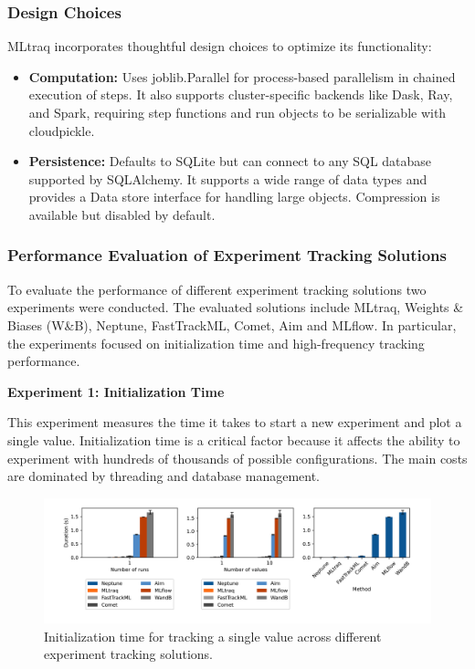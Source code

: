 \subsubsection{Design Choices}

MLtraq incorporates thoughtful design choices to optimize its functionality:

\begin{itemize}
    \item \textbf{Computation:} Uses joblib.Parallel for process-based parallelism in chained execution of steps. It also supports cluster-specific backends like Dask, Ray, and Spark, requiring step functions and run objects to be serializable with cloudpickle.
    \item \textbf{Persistence:} Defaults to SQLite but can connect to any SQL database supported by SQLAlchemy. It supports a wide range of data types and provides a Data store interface for handling large objects. Compression is available but disabled by default.
\end{itemize}

\subsubsection{Performance Evaluation of Experiment Tracking Solutions}

To evaluate the performance of different experiment tracking solutions two experiments were conducted. The evaluated solutions include MLtraq, Weights \& Biases (W\&B), Neptune, FastTrackML, Comet, Aim and MLflow. In particular, the experiments focused on initialization time and high-frequency tracking performance. \newline

\textbf{Experiment 1: Initialization Time}

This experiment measures the time it takes to start a new experiment and plot a single value. Initialization time is a critical factor because it affects the ability to experiment with hundreds of thousands of possible configurations. The main costs are dominated by threading and database management.

\begin{figure}[h!]
    \centering
    \includegraphics[width=\textwidth]{images/mltraq/mltraq-Initialization-time.png}
    \caption{Initialization time for tracking a single value across different experiment tracking solutions.}
    \label{fig:init-time}
\end{figure}

